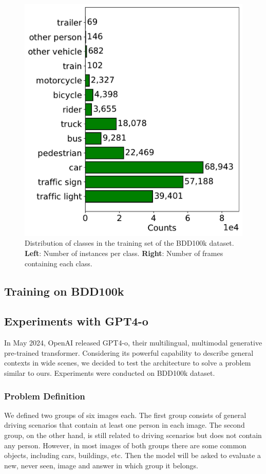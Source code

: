 \begin{figure}
\begin{minipage}{0.49\textwidth}
        \includegraphics[width=\textwidth]{images/bdd100k/frame_counts.pdf}
    \end{minipage}
    \caption{Distribution of classes in the training set of the BDD100k dataset.
    \textbf{Left}: Number of instances per class. 
    \textbf{Right}: Number of frames containing each class.
    }
    \label{fig:bdd100k_distribution}
\end{figure}

\subsection{Training on BDD100k}

\subsection{Experiments with GPT4-o}
In May 2024, OpenAI released GPT4-o, their multilingual, multimodal generative 
pre-trained transformer. Considering its powerful capability to describe general 
contexts in wide scenes, we decided to test the architecture to solve a problem 
similar to ours. Experiments were conducted on BDD100k dataset.

\subsubsection{Problem Definition}
We defined two groups of six images each. The first group consists of general 
driving scenarios that contain at least one person in each image. 
The second group, on the other hand, is still related to driving scenarios but 
does not contain any person. However, in most images of both groups there are 
some common objects, including cars, buildings, etc.
Then the model will be asked to evaluate a new, never seen, image and answer 
in which group it belongs.

